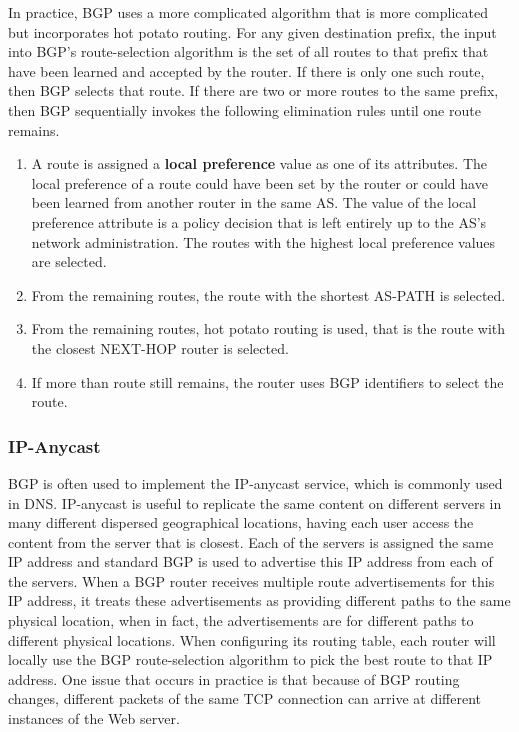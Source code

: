 In practice, BGP uses a more complicated algorithm that is more complicated but incorporates hot potato routing. For any given destination prefix, the input into BGP's route-selection algorithm is the set of all routes to that prefix that have been learned and accepted by the router. If there is only one such route, then BGP selects that route. If there are two or more routes to the same prefix, then BGP sequentially invokes the following elimination rules until one route remains.
\begin{enumerate}
\item A route is assigned a \textbf{local preference} value as one of its attributes. The local preference of a route could have been set by the router or could have been learned from another router in the same AS. The value of the local preference attribute is a policy decision that is left entirely up to the AS's network administration. The routes with the highest local preference values are selected.
\item From the remaining routes, the route with the shortest AS-PATH is selected. 
\item From the remaining routes, hot potato routing is used, that is the route with the closest NEXT-HOP router is selected.
\item If more than route still remains, the router uses BGP identifiers to select the route.
\end{enumerate}

\subsubsection{IP-Anycast}
BGP is often used to implement the IP-anycast service, which is commonly used in DNS. IP-anycast is useful to replicate the same content on different servers in many different dispersed geographical locations, having each user access the content from the server that is closest. Each of the servers is assigned the same IP address and standard BGP is used to advertise this IP address from each of the servers. When a BGP router receives multiple route advertisements for this IP address, it treats these advertisements as providing different paths to the same physical location, when in fact, the advertisements are for different paths to different physical locations. When configuring its routing table, each router will locally use the BGP route-selection algorithm to pick the best route to that IP address. One issue that occurs in practice is that because of BGP routing changes, different packets of the same TCP connection can arrive at different instances of the Web server.

